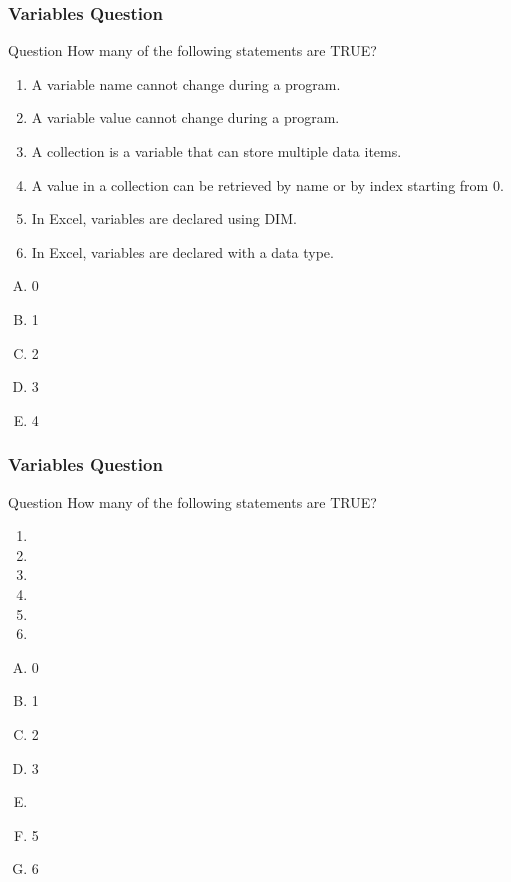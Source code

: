 \documentclass[xcolor=svgnames,handout]{beamer}
\newcommand{\ft}[1]{\frametitle{#1}}
\begin{document}
\begin{frame}[fragile]
\ft{Variables Question}
\begin{exampleblock}
{Question} How many of the following statements are TRUE?
\begin{enumerate}
\item A variable name cannot change during a program.
\item A variable value cannot change during a program.
\item A collection is a variable that can store multiple data items.
\item A value in a collection can be retrieved by name or by index starting from 0.
\item In Excel, variables are declared using DIM.
\item In Excel, variables are declared with a data type.
\end{enumerate}
\begin{multicols}{5}
\begin{enumerate}[A)]
\item 0 
\item 1
\item 2
\item 3
\item 4
\end{enumerate}
\end{multicols}
\end{exampleblock}
\end{frame}


\begin{frame}[fragile]
\ft{Variables Question}
\begin{block}
{Question} How many of the following statements are TRUE?
\begin{enumerate}
\item {}
\item {}
\item {}
\item {}
\item {}
\item {}
\end{enumerate}
\begin{multicols}{7}
\begin{enumerate}[A)]
\item 0 
\item 1
\item 2
\item 3
\item \textbf<6>{\textit<6>{{}}}
\item 5
\item 6
\end{enumerate}
\end{multicols}
\end{block}
\end{frame}
\end{document}
